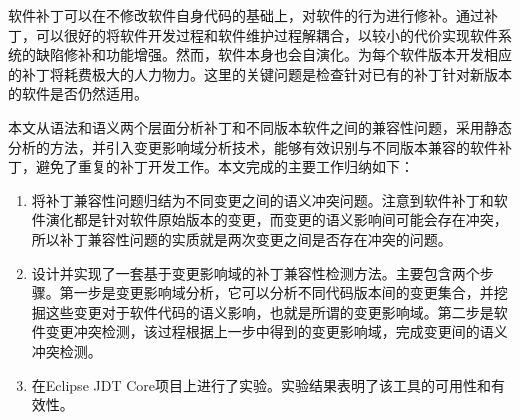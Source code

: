 


\begin{cabstract} 
	软件补丁可以在不修改软件自身代码的基础上，对软件的行为进行修补。通过补丁，可以很好的将软件开发过程和软件维护过程解耦合，以较小的代价实现软件系统的缺陷修补和功能增强。然而，软件本身也会自演化。为每个软件版本开发相应的补丁将耗费极大的人力物力。这里的关键问题是检查针对已有的补丁针对新版本的软件是否仍然适用。
	
	本文从语法和语义两个层面分析补丁和不同版本软件之间的兼容性问题，采用静态分析的方法，并引入变更影响域分析技术，能够有效识别与不同版本兼容的软件补丁，避免了重复的补丁开发工作。本文完成的主要工作归纳如下：
	
	\begin{enumerate}
		\item 将补丁兼容性问题归结为不同变更之间的语义冲突问题。注意到软件补丁和软件演化都是针对软件原始版本的变更，而变更的语义影响间可能会存在冲突，所以补丁兼容性问题的实质就是两次变更之间是否存在冲突的问题。
		\item 设计并实现了一套基于变更影响域的补丁兼容性检测方法。主要包含两个步骤。第一步是变更影响域分析，它可以分析不同代码版本间的变更集合，并挖掘这些变更对于软件代码的语义影响，也就是所谓的变更影响域。第二步是软件变更冲突检测，该过程根据上一步中得到的变更影响域，完成变更间的语义冲突检测。
		\item 在Eclipse JDT Core项目上进行了实验。实验结果表明了该工具的可用性和有效性。
	\end{enumerate}
	
%	
%	
\end{cabstract}

